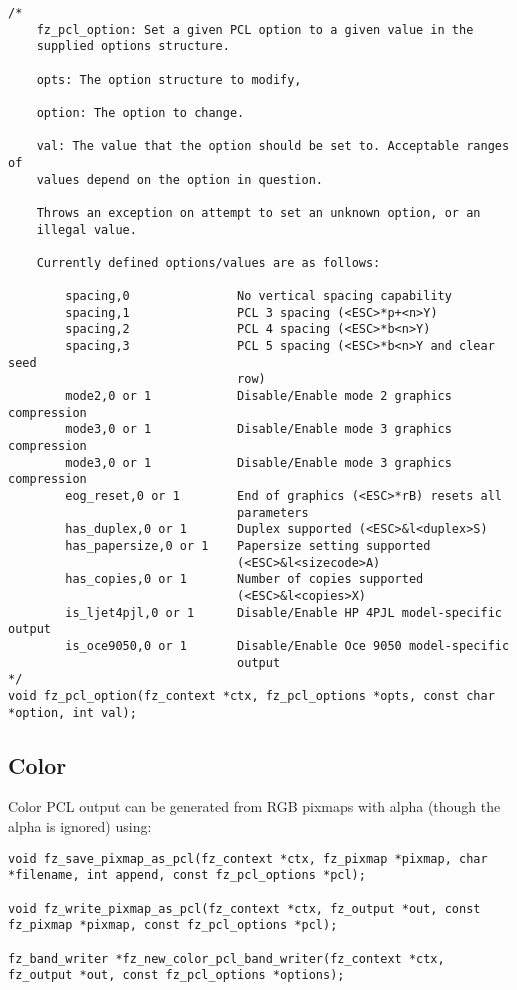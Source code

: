 \documentclass[oneside]{book}
\begin{document}
\begin{lstlisting}
/*
	fz_pcl_option: Set a given PCL option to a given value in the
	supplied options structure.

	opts: The option structure to modify,

	option: The option to change.

	val: The value that the option should be set to. Acceptable ranges of
	values depend on the option in question.

	Throws an exception on attempt to set an unknown option, or an
	illegal value.

	Currently defined options/values are as follows:

		spacing,0				No vertical spacing capability
		spacing,1				PCL 3 spacing (<ESC>*p+<n>Y)
		spacing,2				PCL 4 spacing (<ESC>*b<n>Y)
		spacing,3				PCL 5 spacing (<ESC>*b<n>Y and clear seed
								row)
		mode2,0 or 1			Disable/Enable mode 2 graphics compression
		mode3,0 or 1			Disable/Enable mode 3 graphics compression
		mode3,0 or 1			Disable/Enable mode 3 graphics compression
		eog_reset,0 or 1		End of graphics (<ESC>*rB) resets all
								parameters
		has_duplex,0 or 1		Duplex supported (<ESC>&l<duplex>S)
		has_papersize,0 or 1	Papersize setting supported
								(<ESC>&l<sizecode>A)
		has_copies,0 or 1		Number of copies supported
								(<ESC>&l<copies>X)
		is_ljet4pjl,0 or 1		Disable/Enable HP 4PJL model-specific output
		is_oce9050,0 or 1		Disable/Enable Oce 9050 model-specific
								output
*/
void fz_pcl_option(fz_context *ctx, fz_pcl_options *opts, const char *option, int val);
\end{lstlisting}

\subsection{Color}

Color PCL output can be generated from RGB pixmaps with alpha (though the alpha is ignored) using:

\begin{lstlisting}
void fz_save_pixmap_as_pcl(fz_context *ctx, fz_pixmap *pixmap, char *filename, int append, const fz_pcl_options *pcl);

void fz_write_pixmap_as_pcl(fz_context *ctx, fz_output *out, const fz_pixmap *pixmap, const fz_pcl_options *pcl);

fz_band_writer *fz_new_color_pcl_band_writer(fz_context *ctx, fz_output *out, const fz_pcl_options *options);
\end{lstlisting}
\end{document}
